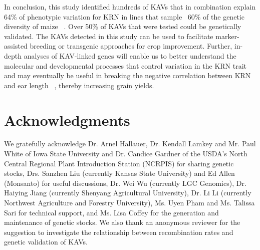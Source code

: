 \documentclass[10pt,letterpaper]{article}
\begin{document}
In conclusion, this study identified hundreds of KAVs that in combination explain 64\% of phenotypic variation for KRN in lines that sample ~60\% of the genetic diversity of maize ~\cite{Liu2003}. Over 50\% of KAVs that were tested could be genetically validated. The KAVs detected in this study can be used to facilitate marker-assisted breeding or transgenic approaches for crop improvement. Further, in-depth analyses of KAV-linked genes will enable us to better understand the molecular and developmental processes that control variation in the KRN trait and may eventually be useful in breaking the negative correlation between KRN and ear length ~\cite{Hallauer2004}, thereby increasing grain yields.





\section*{Acknowledgments}
We gratefully acknowledge Dr. Arnel Hallauer, Dr. Kendall Lamkey and Mr. Paul White of Iowa State University and Dr. Candice Gardner of the USDA’s North Central Regional Plant Introduction Station (NCRPIS) for sharing genetic stocks, Drs. Sanzhen Liu (currently Kansas State University) and Ed Allen (Monsanto) for useful discussions, Dr. Wei Wu (currently LGC Genomics), Dr. Haiying Jiang (currently Shenyang Agricultural University), Dr. Li Li (currently Northwest Agriculture and Forestry University), Ms. Uyen Pham and Ms. Talissa Sari for technical support, and Ms. Lisa Coffey for the generation and maintenance of genetic stocks.  We also thank an anonymous reviewer for the suggestion to investigate the relationship between recombination rates and genetic validation of KAVs.


\nolinenumbers
\end{document}
